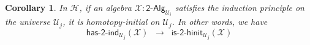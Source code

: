 \documentclass[11pt]{article}
\newcommand{\X}{\mathcal{X}}
\newcommand{\UU}{\mathcal{U}}
\newcommand{\BoolAlg}{\mathsf{2}\text{-}\mathsf{Alg}}
\newcommand{\HasBoolRec}{\mathsf{has}\text{-}\mathsf{2}\text{-}\mathsf{rec}}
\newcommand{\HasBoolInd}{\mathsf{has}\text{-}\mathsf{2}\text{-}\mathsf{ind}}
\newcommand{\HasBoolRecUniq}{\mathsf{has}\text{-}\mathsf{2}\text{-}\mathsf{rec}\text{-}\mathsf{uniq}}
\newcommand{\IsBoolHInit}{\mathsf{is}\text{-}\mathsf{2}\text{-}\mathsf{hinit}}
\newcommand{\Hint}{\mathcal{H}}
\newtheorem{lemma}[theorem]{Lemma}
\newtheorem{corollary}[theorem]{Corollary}
\theoremstyle{definition}
\begin{document}

\begin{corollary}
In $\Hint$, if an algebra $\X : \BoolAlg_{\UU_i}$ satisfies the induction principle on the universe $\UU_j$, it is homotopy-initial on $\UU_j$. In other words, we have
\[ \HasBoolInd_{\UU_j}(\X) \;\; \rightarrow \;\; \IsBoolHInit_{\UU_j}(\X) \]
\end{corollary}
\end{document}
